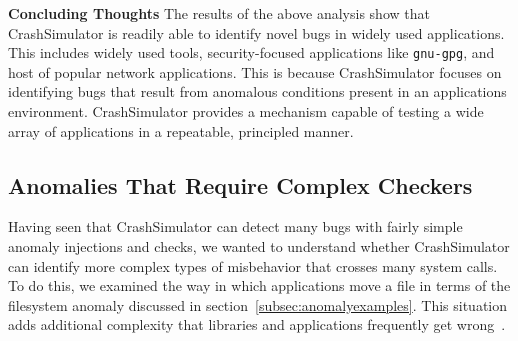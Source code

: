 {\bf Concluding Thoughts}
The results of the above analysis show that CrashSimulator is readily able to
identify novel bugs in widely used applications.  This includes
widely used tools, security-focused applications like {\tt gnu-gpg}, and 
host of popular network applications.  This is
because CrashSimulator focuses on identifying bugs that result from anomalous
conditions present in an applications environment.  CrashSimulator provides
a mechanism capable of testing a wide array of applications in a
repeatable, principled manner.



\subsection{Anomalies That Require Complex Checkers}
\label{sec-complex}


Having seen that CrashSimulator can detect many bugs with fairly 
simple anomaly injections and checks,
we wanted to understand whether CrashSimulator can identify more complex types
of misbehavior that crosses many system calls.
To do this, we examined the
way in which applications move a file in terms of the filesystem anomaly discussed in
section~\ref{subsec:anomalyexamples}.  This situation adds additional complexity that libraries and applications
frequently get wrong~\cite{PHPRenameBug,PythonShutilBug,NodejsCopyBug}.

